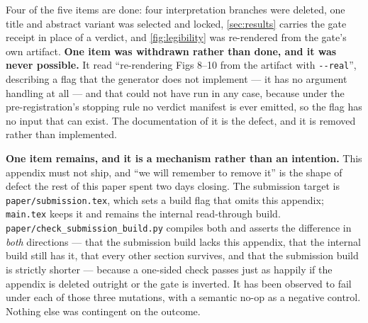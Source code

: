 Four of the five items are done: four interpretation branches were deleted, one title and abstract
variant was selected and locked, \cref{sec:results} carries the gate receipt in place of a verdict,
and \cref{fig:legibility} was re-rendered from the gate's own artifact. \textbf{One item was
withdrawn rather than done, and it was never possible.} It read ``re-rendering Figs 8--10 from the
artifact with \texttt{-{}-real}'', describing a flag that the generator does not implement --- it
has no argument handling at all --- and that could not have run in any case, because under the
pre-registration's stopping rule no verdict manifest is ever emitted, so the flag has no input that
can exist. The documentation of it is the defect, and it is removed rather than implemented.

\textbf{One item remains, and it is a mechanism rather than an intention.} This appendix must
not ship, and ``we will remember to remove it'' is the shape of defect the rest of this paper spent
two days closing. The submission target is \texttt{paper/submission.tex}, which sets a build flag
that omits this appendix; \texttt{main.tex} keeps it and remains the internal read-through build.
\texttt{paper/check\_submission\_build.py} compiles both and asserts the difference in \emph{both}
directions --- that the submission build lacks this appendix, that the internal build still has it,
that every other section survives, and that the submission build is strictly shorter --- because a
one-sided check passes just as happily if the appendix is deleted outright or the gate is inverted.
It has been observed to fail under each of those three mutations, with a semantic no-op as a
negative control. Nothing else was contingent on the outcome.
